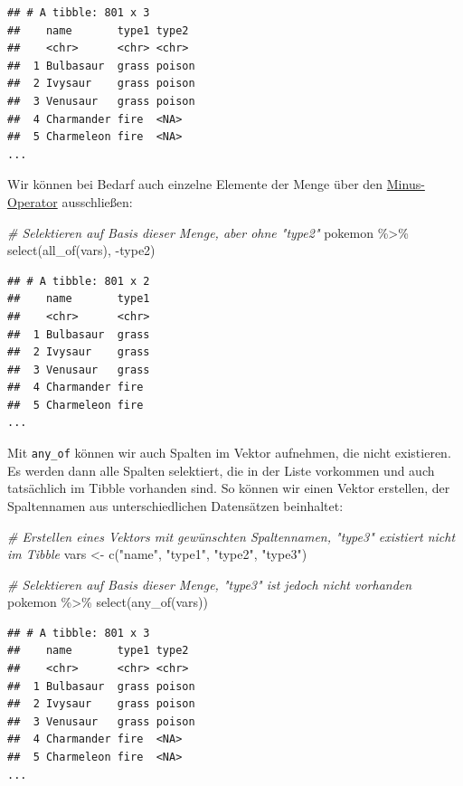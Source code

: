 \documentclass[
]{book}
\newenvironment{Shaded}{\begin{snugshade}}{\end{snugshade}}
\newcommand{\CommentTok}[1]{\textcolor[rgb]{0.56,0.35,0.01}{\textit{#1}}}
\newcommand{\FunctionTok}[1]{\textcolor[rgb]{0.00,0.00,0.00}{#1}}
\newcommand{\NormalTok}[1]{#1}
\newcommand{\OtherTok}[1]{\textcolor[rgb]{0.56,0.35,0.01}{#1}}
\newcommand{\SpecialCharTok}[1]{\textcolor[rgb]{0.00,0.00,0.00}{#1}}
\newcommand{\StringTok}[1]{\textcolor[rgb]{0.31,0.60,0.02}{#1}}
\begin{document}
\begin{verbatim}
## # A tibble: 801 x 3
##    name       type1 type2 
##    <chr>      <chr> <chr> 
##  1 Bulbasaur  grass poison
##  2 Ivysaur    grass poison
##  3 Venusaur   grass poison
##  4 Charmander fire  <NA>  
##  5 Charmeleon fire  <NA>  
...
\end{verbatim}

Wir können bei Bedarf auch einzelne Elemente der Menge über den \protect\hyperlink{minus-operator}{Minus-Operator} ausschließen:

\begin{Shaded}
\begin{Highlighting}[]
\CommentTok{\# Selektieren auf Basis dieser Menge, aber ohne "type2"}
\NormalTok{pokemon }\SpecialCharTok{\%\textgreater{}\%} 
  \FunctionTok{select}\NormalTok{(}\FunctionTok{all\_of}\NormalTok{(vars), }\SpecialCharTok{{-}}\NormalTok{type2)}
\end{Highlighting}
\end{Shaded}

\begin{verbatim}
## # A tibble: 801 x 2
##    name       type1
##    <chr>      <chr>
##  1 Bulbasaur  grass
##  2 Ivysaur    grass
##  3 Venusaur   grass
##  4 Charmander fire 
##  5 Charmeleon fire 
...
\end{verbatim}

Mit \texttt{any\_of} können wir auch Spalten im Vektor aufnehmen, die nicht existieren. Es werden dann alle Spalten selektiert, die in der Liste vorkommen und auch tatsächlich im Tibble vorhanden sind. So können wir einen Vektor erstellen, der Spaltennamen aus unterschiedlichen Datensätzen beinhaltet:

\begin{Shaded}
\begin{Highlighting}[]
\CommentTok{\# Erstellen eines Vektors mit gewünschten Spaltennamen, "type3" existiert nicht im Tibble}
\NormalTok{vars }\OtherTok{\textless{}{-}} \FunctionTok{c}\NormalTok{(}\StringTok{"name"}\NormalTok{, }\StringTok{"type1"}\NormalTok{, }\StringTok{"type2"}\NormalTok{, }\StringTok{"type3"}\NormalTok{)}

\CommentTok{\# Selektieren auf Basis dieser Menge, "type3" ist jedoch nicht vorhanden}
\NormalTok{pokemon }\SpecialCharTok{\%\textgreater{}\%}
  \FunctionTok{select}\NormalTok{(}\FunctionTok{any\_of}\NormalTok{(vars))}
\end{Highlighting}
\end{Shaded}

\begin{verbatim}
## # A tibble: 801 x 3
##    name       type1 type2 
##    <chr>      <chr> <chr> 
##  1 Bulbasaur  grass poison
##  2 Ivysaur    grass poison
##  3 Venusaur   grass poison
##  4 Charmander fire  <NA>  
##  5 Charmeleon fire  <NA>  
...
\end{verbatim}
\end{document}
